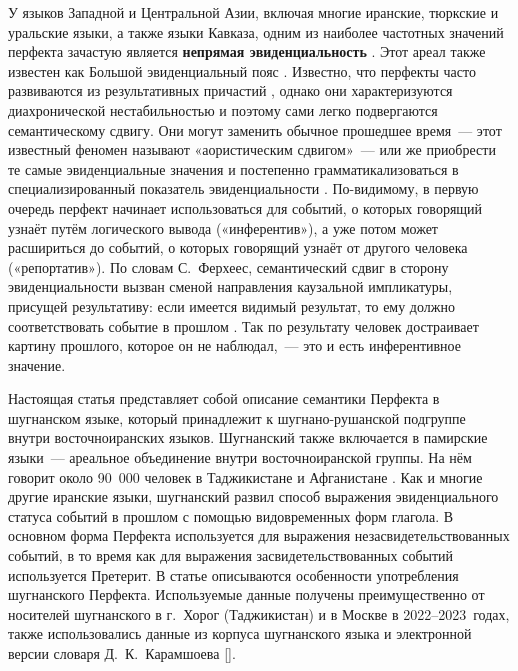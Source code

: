 У языков Западной и Центральной Азии, включая многие иранские, тюркские и уральские языки, а также языки Кавказа, одним из наиболее частотных значений перфекта зачастую является \textbf{непрямая эвиденциальность} \parencites[93]{lazard1999}[375]{lindstedt2000}. Этот ареал также известен как Большой эвиденциальный пояс \parencite[14–15]{plungian2016}. Известно, что перфекты часто развиваются из результативных причастий \parencites[68–69]{bybee_etal1994}[367–373]{lindstedt2000}, однако они характеризуются диахронической нестабильностью и поэтому сами легко подвергаются семантическому сдвигу. Они могут заменить обычное прошедшее время~— этот известный феномен называют «аористическим сдвигом»~— или же приобрести те самые эвиденциальные значения и постепенно грамматикализоваться в специализированный показатель эвиденциальности \parencite[95–97]{bybee_etal1994}. По-видимому, в первую очередь перфект начинает использоваться для событий, о которых говорящий узнаёт путём логического вывода («инферентив»), а уже потом может расшириться до событий, о которых говорящий узнаёт от другого человека («репортатив»). По словам С.~Ферхеес, семантический сдвиг в сторону эвиденциальности вызван сменой направления каузальной импликатуры, присущей результативу: если имеется видимый результат, то ему должно соответствовать событие в прошлом \parencite[78]{verhees2019}. Так по результату человек достраивает картину прошлого, которое он не наблюдал,~— это и есть инферентивное значение.

Настоящая статья представляет собой описание семантики Перфекта в шугнанском языке, который принадлежит к шугнано-рушанской подгруппе внутри восточноиранских языков. Шугнанский также включается в памирские языки~— ареальное объединение внутри восточноиранской группы. На нём говорит около 90~000 человек в Таджикистане и Афганистане \parencite[787–788]{edelman_dodykhudoeva2009_shughni}. Как и многие другие иранские языки, шугнанский развил способ выражения эвиденциального статуса событий в прошлом с помощью видовременных форм глагола. В основном форма Перфекта используется для выражения незасвидетельствованных событий, в то время как для выражения засвидетельствованных событий используется Претерит. В статье описываются особенности употребления шугнанского Перфекта. Используемые данные получены преимущественно от носителей шугнанского в г.~Хорог (Таджикистан) и в Москве в 2022–2023~годах, также использовались данные из корпуса шугнанского языка и электронной версии \parencite{makarov_etal2022} словаря Д.~К.~Карамшоева [\cite*{karamshoev1988}].

